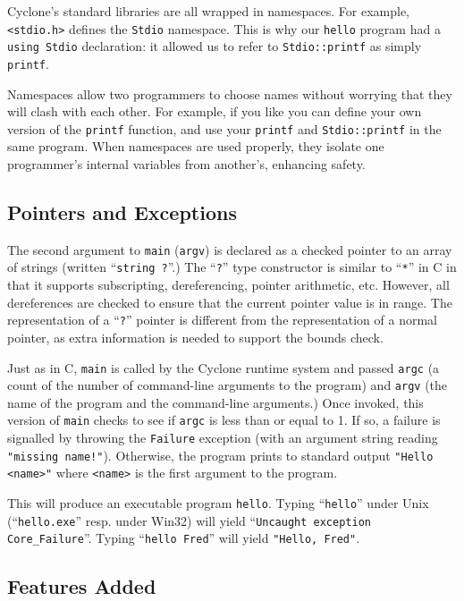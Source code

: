 Cyclone's standard libraries are all wrapped in namespaces.  For
example, \texttt{<stdio.h>} defines the \texttt{Stdio} namespace.
This is why our \texttt{hello} program had a \texttt{using Stdio}
declaration: it allowed us to refer to \texttt{Stdio::printf} as
simply \texttt{printf}.

Namespaces allow two programmers to choose names without worrying that
they will clash with each other.  For example, if you like you can
define your own version of the \texttt{printf} function, and use your
\texttt{printf} and \texttt{Stdio::printf} in the same program.  When
namespaces are used properly, they isolate one programmer's internal
variables from another's, enhancing safety.

\subsection{Pointers and Exceptions}

The second argument to \texttt{main} (\texttt{argv}) is declared as a
checked pointer to an array of strings (written ``\texttt{string ?}''.)
The ``\texttt{?}'' type constructor is similar to ``\texttt{*}'' in C in
that it supports subscripting, dereferencing, pointer arithmetic, etc.
However, all dereferences are checked to ensure that the current
pointer value is in range. The representation of a ``\texttt{?}''
pointer is different from the representation of a normal pointer, as
extra information is needed to support the bounds check.

Just as in C, \texttt{main} is called by the Cyclone runtime system and
passed \texttt{argc} (a count of the number of command-line arguments to
the program) and \texttt{argv} (the name of the program and the
command-line arguments.)  Once invoked, this version of \texttt{main}
checks to see if \texttt{argc} is less than or equal to 1.  If so, a
failure is signalled by throwing the \texttt{Failure} exception (with an
argument string reading \texttt{"missing name!"}).  Otherwise, the
program prints to standard output \texttt{"Hello <name>"} where
\texttt{<name>} is the first argument to the program.

This will produce an executable program \texttt{hello}.  Typing
``\texttt{hello}'' under Unix (``\texttt{hello.exe}'' resp. under Win32)
will yield ``\texttt{Uncaught exception Core_Failure}''.  Typing
``\texttt{hello Fred}'' will yield \texttt{"Hello, Fred"}.

\subsection{Features Added}

